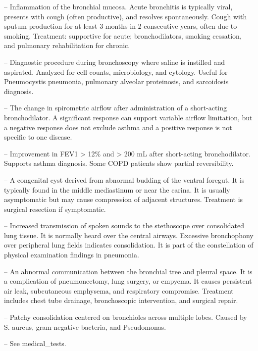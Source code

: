 -- Inflammation of the bronchial mucosa. Acute bronchitis is typically viral, presents with cough (often productive), and resolves spontaneously. Cough with sputum production for at least 3 months in 2 consecutive years, often due to smoking. Treatment: supportive for acute; bronchodilators, smoking cessation, and pulmonary rehabilitation for chronic.

-- Diagnostic procedure during bronchoscopy where saline is instilled and aspirated. Analyzed for cell counts, microbiology, and cytology. Useful for Pneumocystis pneumonia, pulmonary alveolar proteinosis, and sarcoidosis diagnosis.

-- The change in spirometric airflow after administration of a short-acting bronchodilator. A significant response can support variable airflow limitation, but a negative response does not exclude asthma and a positive response is not specific to one disease.

-- Improvement in FEV1 > 12\% and > 200 mL after short-acting bronchodilator. Supports asthma diagnosis. Some COPD patients show partial reversibility.

-- A congenital cyst derived from abnormal budding of the ventral foregut. It is typically found in the middle mediastinum or near the carina. It is usually asymptomatic but may cause compression of adjacent structures. Treatment is surgical resection if symptomatic.

-- Increased transmission of spoken sounds to the stethoscope over consolidated lung tissue. It is normally heard over the central airways. Excessive bronchophony over peripheral lung fields indicates consolidation. It is part of the constellation of physical examination findings in pneumonia.

-- An abnormal communication between the bronchial tree and pleural space. It is a complication of pneumonectomy, lung surgery, or empyema. It causes persistent air leak, subcutaneous emphysema, and respiratory compromise. Treatment includes chest tube drainage, bronchoscopic intervention, and surgical repair.

-- Patchy consolidation centered on bronchioles across multiple lobes. Caused by S. aureus, gram-negative bacteria, and Pseudomonas.

-- See medical\_tests.

